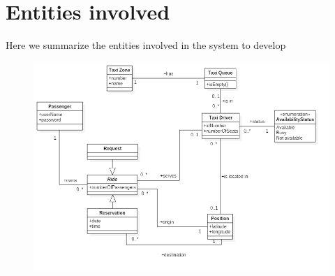 \section{Entities involved}
Here we summarize the entities involved in the system to develop
\begin{figure}[H]
\centering
\includegraphics[scale=0.5]{Images/class_diagram}
\end{figure}